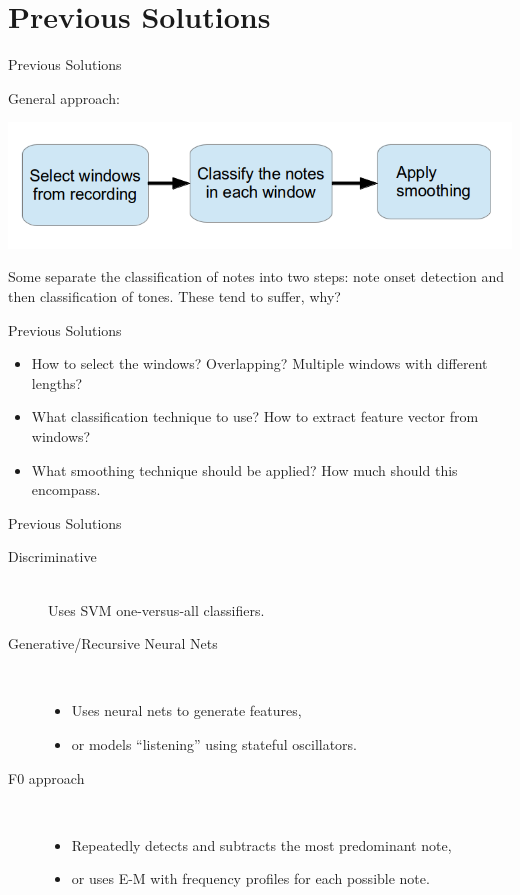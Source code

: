 \documentclass{beamer}
\begin{document}
\section{Previous Solutions}
\begin{frame}{Previous Solutions}

General approach:

\includegraphics[scale=.4]{algorithm_template.png}

Some separate the classification of notes into two steps: note onset detection and then classification of tones. These tend to suffer, why?
\end{frame}

\begin{frame}{Previous Solutions}
\begin{itemize}
\item How to select the windows? Overlapping? Multiple windows with different lengths?
\item What classification technique to use? How to extract feature vector from windows?
\item What smoothing technique should be applied? How much should this encompass.
\end{itemize}
\end{frame}

\begin{frame}{Previous Solutions}
\begin{description}
\item[Discriminative] \mbox{} \\
  Uses SVM one-versus-all classifiers.
\item[Generative/Recursive Neural Nets] \mbox{} \\
  \begin{itemize}
  \item 
    Uses neural nets to generate features,
  \item
    or models ``listening'' using stateful oscillators.
  \end{itemize}
\item[F0 approach] \mbox{} \\
  \begin{itemize}
  \item
    Repeatedly detects and subtracts the most predominant note,
  \item
    or uses E-M with frequency profiles for each possible note.
  \end{itemize}
\end{description}
\end{frame}
\end{document}
